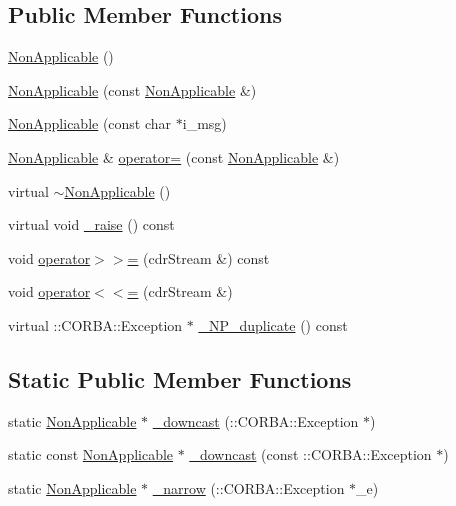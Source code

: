 \subsection*{Public Member Functions}
\begin{DoxyCompactItemize}
\item 
\hyperlink{class_draw_service_1_1_non_applicable_a074024a8d4807c96f2031dbdbeb544e6}{Non\+Applicable} ()
\item 
\hyperlink{class_draw_service_1_1_non_applicable_ac35b09cc3e046d2911556ad102e7a165}{Non\+Applicable} (const \hyperlink{class_draw_service_1_1_non_applicable}{Non\+Applicable} \&)
\item 
\hyperlink{class_draw_service_1_1_non_applicable_aaf130b75e73b3b2448aaac935dad9db0}{Non\+Applicable} (const char $\ast$i\+\_\+msg)
\item 
\hyperlink{class_draw_service_1_1_non_applicable}{Non\+Applicable} \& \hyperlink{class_draw_service_1_1_non_applicable_aa32f8be3b6a30929dedae9540aa65de1}{operator=} (const \hyperlink{class_draw_service_1_1_non_applicable}{Non\+Applicable} \&)
\item 
virtual \hyperlink{class_draw_service_1_1_non_applicable_a7cd1d3edf98966395f3a947d797da041}{$\sim$\+Non\+Applicable} ()
\item 
virtual void \hyperlink{class_draw_service_1_1_non_applicable_a080153769f193765a91554bbc36a5a5e}{\+\_\+raise} () const 
\item 
void \hyperlink{class_draw_service_1_1_non_applicable_ad248294f599a119559723271cc48b996}{operator$>$$>$=} (cdr\+Stream \&) const 
\item 
void \hyperlink{class_draw_service_1_1_non_applicable_a08439793c6371e96e79c8f35117811fe}{operator$<$$<$=} (cdr\+Stream \&)
\item 
virtual \+::C\+O\+R\+B\+A\+::\+Exception $\ast$ \hyperlink{class_draw_service_1_1_non_applicable_a4eaad79cf8c2247a63c758d3cb2c1acf}{\+\_\+\+N\+P\+\_\+duplicate} () const 
\end{DoxyCompactItemize}
\subsection*{Static Public Member Functions}
\begin{DoxyCompactItemize}
\item 
static \hyperlink{class_draw_service_1_1_non_applicable}{Non\+Applicable} $\ast$ \hyperlink{class_draw_service_1_1_non_applicable_a68ef4ed2fab0e2dd5bc6b3fd3f4e7f09}{\+\_\+downcast} (\+::C\+O\+R\+B\+A\+::\+Exception $\ast$)
\item 
static const \hyperlink{class_draw_service_1_1_non_applicable}{Non\+Applicable} $\ast$ \hyperlink{class_draw_service_1_1_non_applicable_af5f9af6d258462b82be778267f4e39b6}{\+\_\+downcast} (const \+::C\+O\+R\+B\+A\+::\+Exception $\ast$)
\item 
static \hyperlink{class_draw_service_1_1_non_applicable}{Non\+Applicable} $\ast$ \hyperlink{class_draw_service_1_1_non_applicable_aa60e848a08f10cf085c2a53d75105cfb}{\+\_\+narrow} (\+::C\+O\+R\+B\+A\+::\+Exception $\ast$\+\_\+e)
\end{DoxyCompactItemize}
